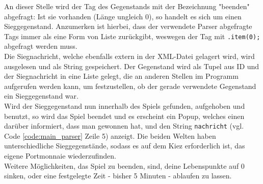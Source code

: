 \documentclass[12pt,twoside]{article}
\theoremstyle{plain}
\theoremstyle{definition}
\theoremstyle{remark}
\begin{document}
An dieser Stelle wird der Tag des Gegenstands mit der Bezeichnung "beenden\string" abgefragt: Ist sie vorhanden (Länge ungleich 0), so handelt es sich um einen Sieggegenstand.
Anzumerken ist hierbei, dass der verwendete Parser abgefragte Tags immer als eine Form von Liste zurückgibt, weswegen der Tag mit \texttt{.item(0);} abgefragt werden muss.\\
Die Siegnachricht, welche ebenfalls extern in der XML-Datei gelagert wird, wird ausgelesen und als String gespeichert.
Der Gegenstand wird als Tupel aus ID und der Siegnachricht in eine Liste gelegt, die an anderen Stellen im Programm aufgerufen werden kann, um festzustellen, ob der gerade verwendete Gegenstand ein Sieggegenstand war.\\
Wird der Sieggegenstand nun innerhalb des Spiels gefunden, aufgehoben und benutzt, so wird das Spiel beendet und es erscheint ein Popup, welches einen darüber informiert, dass man gewonnen hat, und den String \texttt{nachricht} (vgl. Code \ref{code:main_parser} Zeile 5) anzeigt.
Die beiden Welten haben unterschiedliche Sieggegenstände, sodass es auf dem Kiez erforderlich ist, das eigene Portmonnaie wiederzufinden.
\\
Weitere Möglichkeiten, das Spiel zu beenden, sind, deine Lebenspunkte auf 0 sinken, oder eine festgelegte Zeit - bisher 5 Minuten - ablaufen zu lassen.

%
%
\end{document}
